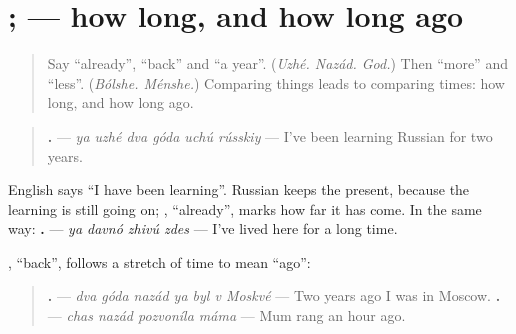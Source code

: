 \section[\texorpdfstring{\ru{уже} \ru{два} \ru{года} … (uzhé dva góda …)}{уже два года … (uzhé dva góda …)}]{  ;    — how long, and how long ago}

\label{lesson:RU-C268-uzhe-let}



\begin{quote}
Say \textquotedblleft{}already\textquotedblright{}, \textquotedblleft{}back\textquotedblright{} and \textquotedblleft{}a year\textquotedblright{}. (\emph{Uzhé. Nazád. God.}) Then \textquotedblleft{}more\textquotedblright{} and \textquotedblleft{}less\textquotedblright{}. (\emph{Bólshe. Ménshe.}) Comparing things leads to comparing times: how long, and how long ago.
\end{quote}

\begin{grammarlens}[title={Grammar Lens: how long, in the present}]
\begin{quote}
\textbf{     .} — \emph{ya uzhé dva góda uchú rússkiy} — I've been learning Russian for two years.
\end{quote}

English says \textquotedblleft{}I have been learning\textquotedblright{}. Russian keeps the present, because the learning is still going on; \textbf{}, \textquotedblleft{}already\textquotedblright{}, marks how far it has come. In the same way: \textbf{   .} — \emph{ya davnó zhivú zdes} — I've lived here for a long time.
\end{grammarlens}

\begin{grammarlens}[title={Grammar Lens: how long ago, in the past}]
\textbf{}, \textquotedblleft{}back\textquotedblright{}, follows a stretch of time to mean \textquotedblleft{}ago\textquotedblright{}:

\begin{quote}
\textbf{      .} — \emph{dva góda nazád ya byl v Moskvé} — Two years ago I was in Moscow. \textbf{   .} — \emph{chas nazád pozvoníla máma} — Mum rang an hour ago.
\end{quote}
\end{grammarlens}

